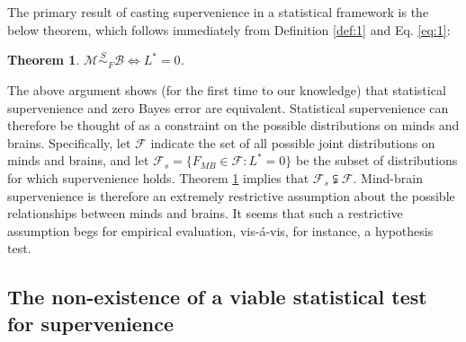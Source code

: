 \documentclass{article}
\newcommand{\PP}{\mathbb{P}}
\newtheorem{thm}{Theorem}
\providecommand{\mc}[1]{\mathcal{#1}}
\newcommand{\mB}{\mathcal{B}}
\newcommand{\mM}{\mathcal{M}}
\newcommand{\MsB}{\mM \overset{S}{\sim}_{F} \mB}
\begin{document}
The primary result of casting supervenience in a statistical framework is the below theorem, which 
follows immediately from Definition \ref{def:1} and Eq. \eqref{eq:1}: 
\begin{thm}
\label{thm:1} 
$\mM \overset{S}{\sim}_{F} \mB \Leftrightarrow L^*= 0$.
\end{thm}


The above argument shows (for the first time to our knowledge) that statistical supervenience and zero Bayes error are equivalent. Statistical supervenience can therefore be thought of as a constraint on the possible distributions on minds and brains.  Specifically, let $\mc{F}$ indicate the set of all possible joint distributions on minds and brains, and let $\mc{F}_s = \{F_{MB} \in \mc{F}: L^*=0\}$ be the subset of distributions for which supervenience holds. Theorem \ref{thm:1} implies that $\mc{F}_s  \subsetneqq \mc{F}$.  Mind-brain supervenience is therefore an extremely restrictive assumption about the possible relationships between minds and brains.  It seems that such a restrictive assumption begs for empirical evaluation, vis-\'a-vis, for instance, a hypothesis test.


\subsection*{The non-existence of a viable statistical test for supervenience} %
\label{sub:subsection_name}
\end{document}
